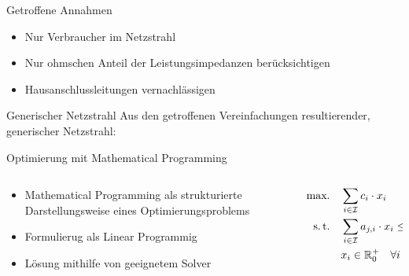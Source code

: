 \documentclass[aspectratio=169]{beamer}
\begin{document}
\begin{frame}{Getroffene Annahmen}
	\begin{itemize}
		\item Nur Verbraucher im Netzstrahl
		\item Nur ohmschen Anteil der Leistungsimpedanzen berücksichtigen
		\item Hausanschlussleitungen vernachlässigen
	\end{itemize}
	
\end{frame}


\begin{frame}{Generischer Netzstrahl}
	Aus den getroffenen Vereinfachungen resultierender, generischer Netzstrahl:
	\vspace{1cm}
	
	\begin{figure}
		
	\end{figure}
\end{frame}


\begin{frame}{Optimierung mit Mathematical Programming}
	\begin{columns}
		\begin{column}{.6\textwidth}
			\begin{itemize}
				\item Mathematical Programming als strukturierte 
				Darstellungsweise eines Optimierungsproblems
				\item Formulierug als Linear Programmig
				\item Lösung mithilfe von geeignetem Solver
			\end{itemize}
		\end{column}
		\begin{column}{.4\textwidth}
			\begin{align*}
				\begin{split}
		\text{max.}\quad&\sum_{i\in\mathcal{I}}c_i\cdot x_i \\
		\text{s.\,t.}\quad&\sum_{i\in\mathcal{I}}a_{j,i}\cdot x_i\leq b_j\quad
		\forall j\in\mathcal{J} \\
		& x_i\in\mathbb{R}_0^+\quad\forall i\in\mathcal{I}
				\end{split}
			\end{align*}
		\end{column}
	\end{columns}
\end{frame}
\end{document}
